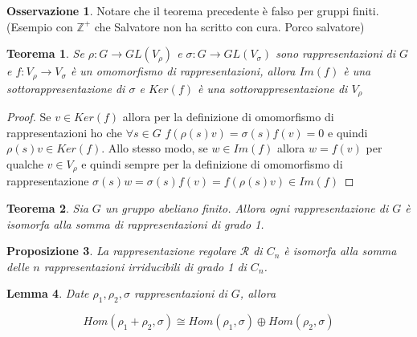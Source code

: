\documentclass[11pt]{article}
\theoremstyle{plain}
\newtheorem{thm}{Teorema}[section]
\newtheorem{lemma}[thm]{Lemma}
\newtheorem{prop}[thm]{Proposizione}
\theoremstyle{definition}
\newtheorem*{rem}{Osservazione}
\theoremstyle{remark}
\begin{document}
\begin{rem} Notare che il teorema precedente è falso per gruppi finiti. (Esempio con $\mathbb{Z}^+$ che Salvatore non ha scritto con cura. Porco salvatore)



\end{rem}



\begin{thm} Se $\rho: G \to GL(V_\rho)$ e $\sigma: G \to GL(V_\sigma)$ sono rappresentazioni di $G$ e $f: V_\rho \to V_\sigma$ è un omomorfismo di rappresentazioni, allora $Im(f)$ è una sottorappresentazione di $\sigma$ e $Ker(f)$ è una sottorappresentazione di $V_\rho$
\end{thm}
\begin{proof}
Se $v\in Ker(f)$ allora per la definizione di omomorfismo di rappresentazioni ho che $\forall s\in G$ $f(\rho(s)v)=\sigma(s)f(v)=0$ e quindi $\rho(s)v\in Ker(f)$. Allo stesso modo, se $w\in Im(f)$ allora $w=f(v)$ per qualche $v\in V_\rho$ e quindi sempre per la definizione di omomorfismo di rappresentazione $\sigma(s)w=\sigma(s)f(v)=f(\rho(s)v)\in Im(f)$
\end{proof}




\begin{thm}Sia $G$ un gruppo abeliano finito. Allora ogni rappresentazione di $G$ è isomorfa alla somma di rappresentazioni di grado 1.



\end{thm}


\begin{prop} La rappresentazione regolare $\mathcal{R}$ di $C_n$ è isomorfa alla somma delle $n$ rappresentazioni irriducibili di grado 1 di $C_n$.

\end{prop}


\begin{lemma}
Date $\rho_1, \rho_2, \sigma$ rappresentazioni di $G$, allora

\[Hom(\rho_1 + \rho_2, \sigma) \cong Hom(\rho_1, \sigma) \oplus Hom(\rho_2, \sigma)\]

\end{lemma}
\end{document}
